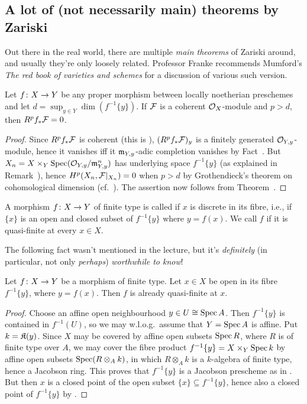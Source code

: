 \documentclass[a4paper,parskip=half,numbers=enddot, DIV=12]{scrreprt}
\begin{document}
\subsection{A lot of (not necessarily main) theorems by Zariski}
Out there in the real world, there are multiple \emph{main theorems} of Zariski around, and usually they're only loosely related. Professor Franke recommends Mumford's \emph{The red book of varieties and schemes} for a discussion of various such version.
\begin{cor}
	Let $f\colon X\morphism Y$ be any proper morphism between locally noetherian preschemes and let $d=\sup_{y\in Y}\dim \left(f^{-1}\{y\}\right)$. If $\mathcal{F}$ is a coherent $\mathcal{O}_X$-module and $p>d$, then $R^pf_*\mathcal{F}=0$.
\end{cor}
\begin{proof}
	Since $R^pf_*\mathcal{F}$ is coherent (this is \cite[Theorem~5]{alggeo2}), $(R^pf_*\mathcal{F})_y$ is a finitely generated $\mathcal{O}_{Y,y}$-module, hence it vanishes iff it $\mathfrak{m}_{Y,y}$-adic completion vanishes by Fact~. But $X_n=X\times_Y\operatorname{Spec} (\mathcal{O}_{Y,y}/\mathfrak{m}_{Y,y}^n)$ has underlying space $f^{-1}\{y\}$ (as explained in Remark~), hence $H^p(X_n,\mathcal{F}|_{X_n})=0$ when $p>d$ by Grothendieck's theorem on cohomological dimension (cf.\ \cite[Proposition~1.4.1]{alggeo2}). The assertion now follows from Theorem~.
\end{proof}
\begin{defi}
	A morphism $f\colon X\morphism Y$ of finite type is called  if $x$ is discrete in its fibre, i.e., if $\{x\}$ is an open and closed subset of $f^{-1}\{y\}$ where $y=f(x)$. We call $f$  if it is quasi-finite at every $x\in X$. 
\end{defi}
The following fact wasn't mentioned in the lecture, but it's \emph{definitely} (in particular, not only \emph{perhaps}) \emph{worthwhile to know}!
\begin{fact}
	Let $f\colon X\morphism Y$ be a morphism of finite type. Let $x\in X$ be open in its fibre $f^{-1}\{y\}$, where $y=f(x)$. Then $f$ is already quasi-finite at $x$. 
\end{fact}
\begin{proof}
	Choose an affine open neighbourhood $y\in U\cong \operatorname{Spec} A$. Then $f^{-1}\{y\}$ is contained in $f^{-1}(U)$, so we may w.l.o.g.\ assume that $Y=\operatorname{Spec} A$ is affine. Put $k=\mathfrak{K}(y)$. Since $X$ may be covered by affine open subsets $\operatorname{Spec} R$, where $R$ is of finite type over $A$, we may cover the fibre product $f^{-1}\{y\}=X\times_Y\operatorname{Spec} k$ by affine open subsets $\operatorname{Spec} (R\otimes_A k)$, in which $R\otimes_A k$ is a $k$-algebra of finite type, hence a Jacobson ring. This proves that $f^{-1}\{y\}$ is a Jacobson prescheme as in \cite[Definition~2.4.2]{alggeo1}. But then $x$ is a closed point of the open subset $\{x\}\subseteq f^{-1}\{y\}$, hence also a closed point of $f^{-1}\{y\}$ by \cite[Fact~2.4.1]{alggeo1}.
\end{proof}
\end{document}
